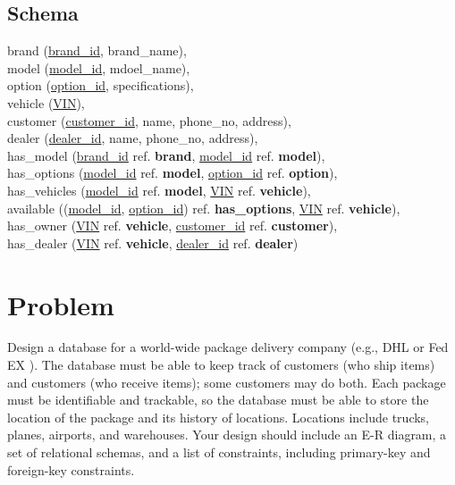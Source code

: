\documentclass{article}
\begin{document}
\subsection{Schema}
\onehalfspacing
\begin{center}
  brand (\underline{brand\_id}, brand\_name), \\
  model (\underline{model\_id}, mdoel\_name), \\
  option (\underline{option\_id}, specifications), \\
  vehicle (\underline{VIN}), \\
  customer (\underline{customer\_id}, name, phone\_no, address), \\
  dealer (\underline{dealer\_id}, name, phone\_no, address), \\
  has\_model (\underline{brand\_id} ref. \textbf{brand}, \underline{model\_id} ref. \textbf{model}), \\
  has\_options (\underline{model\_id} ref. \textbf{model}, \underline{option\_id} ref. \textbf{option}), \\
  has\_vehicles (\underline{model\_id} ref. \textbf{model}, \underline{VIN} ref. \textbf{vehicle}), \\
  available ((\underline{model\_id}, \underline{option\_id}) ref. \textbf{has\_options}, \underline{VIN} ref. \textbf{vehicle}), \\
  has\_owner (\underline{VIN} ref. \textbf{vehicle}, \underline{customer\_id} ref. \textbf{customer}), \\
  has\_dealer (\underline{VIN} ref. \textbf{vehicle}, \underline{dealer\_id} ref. \textbf{dealer}) \\
\end{center}

\section{Problem }
Design a database for a world-wide package delivery company (e.g., DHL or Fed EX ). The database
must be able to keep track of customers (who ship items) and customers (who receive items); some
customers may do both. Each package must be identifiable and trackable, so the database must be able to
store the location of the package and its history of locations.
Locations include trucks, planes, airports, and warehouses. Your design should include an E-R diagram, a
set of relational schemas, and a list of constraints, including primary-key and foreign-key constraints.
\end{document}
